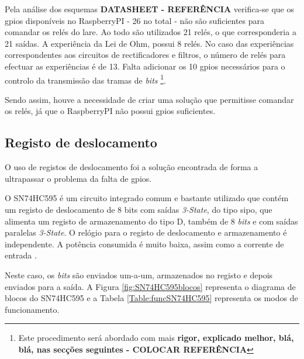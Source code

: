 Pela análise dos esquemas \textbf{DATASHEET - REFERÊNCIA} verifica-se que os \acrshort{gpio}s disponíveis no \gls{RaspberryPI} - 26 no total - não são suficientes para comandar os relés do \acrshort{lare}. Ao todo são utilizados 21 relés, o que corresponderia a 21 saídas. A experiência da Lei de Ohm, possui 8 relés. No caso das experiências correspondentes aos circuitos de rectificadores e filtros, o número de relés para efectuar as experiências é de 13. Falta adicionar os 10 \acrshort{gpio}s necessários para o controlo da transmissão das tramas de \textit{bits} \footnote{Este procedimento será abordado com mais \textbf{rigor, explicado melhor, blá, blá, nas secções seguintes - COLOCAR REFERÊNCIA}}.

Sendo assim, houve a necessidade de criar uma solução que permitisse comandar os relés, já que o \gls{RaspberryPI} não possui \acrshort{gpio}s suficientes.

\subsection{Registo de deslocamento}
O uso de registos de deslocamento foi a solução encontrada de forma a ultrapassar o problema da falta de \acrshort{gpio}s.

O SN74HC595 é um circuito integrado comum e bastante utilizado que contém um registo de deslocamento de 8 bits com saídas \textit{3-State}, do tipo \acrfull{sipo}, que alimenta um registo de armazenamento do tipo D, também de 8 \textit{bits} e com saídas paralelas \textit{3-State}. O relógio para o registo de deslocamento e armazenamento é independente. A potência consumida é muito baixa, assim como a corrente de entrada \cite{SN74HC595}.

Neste caso, os \textit{bits} são enviados um-a-um, armazenados no registo e depois enviados para a saída. A Figura \ref{fig:SN74HC595blocos} representa o diagrama de blocos do SN74HC595 e a Tabela \ref{Table:funcSN74HC595} representa os modos de funcionamento.

